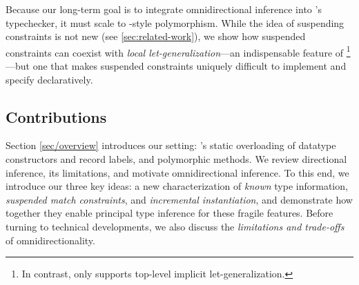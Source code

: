 \documentclass[acmsmall,screen,nonacm%
\Anonymous{,anonymous}{}%
\Final{}{,review}%
]{acmart}
\begin{document}

Because our long-term goal is to integrate omnidirectional inference into
\OCaml's typechecker, it must scale to \ML-style polymorphism. While the idea
of suspending constraints is not new (see \cref{sec:related-work}), we show how
suspended constraints can coexist with \ML \emph{local let-generalization}---an
indispensable feature of \OCaml\footnote{In contrast, \Haskell only supports
top-level implicit let-generalization.}---but one that makes suspended
constraints uniquely difficult to implement and specify declaratively.

\subsection* {Contributions}

Section \cref{sec/overview} introduces our setting: \OCaml's static overloading
of datatype constructors and record labels, and polymorphic methods. We review
directional inference, its limitations, and motivate omnidirectional inference.
To this end, we introduce our three key ideas: a new characterization of
\emph{known} type information, \emph{suspended match constraints}, and
\emph{incremental instantiation}, and demonstrate how together they enable
principal type inference for these fragile features. Before turning to
technical developments, we also discuss the \emph{limitations and trade-offs}
of omnidirectionality.
\end{document}

